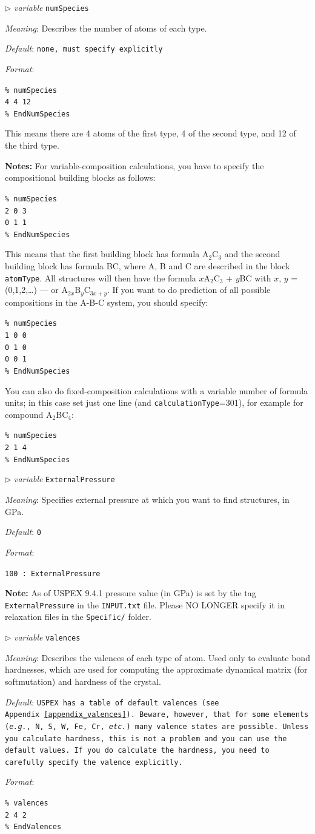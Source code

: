 \documentclass[12pt]{article}
\newcommand{\keyword}[1]{\texttt{#1}}
\newcommand{\file}[1]{\texttt{#1}}
\newcommand{\textshift}[1]{{\addtolength{\leftskip}{10mm}\texttt{{#1}}\par}}
\newcommand{\paramacro}[6]{
\vspace{0.5cm}
$\triangleright$ \emph{variable} {\color{blue} \texttt{#1}}

\emph{Meaning}: {#2}

{#3}

\emph{Default}: \texttt{#4}

\emph{Format}:

{\addtolength{\leftskip}{10mm} 
\texttt{#5}
\par}


{\small #6}

}
\begin{document}
\paramacro{numSpecies}{Describes the number of atoms of each type.}{}{\rm none,
must specify explicitly}{\% numSpecies \\
4 4 12 \\
\% EndNumSpecies}{
This means there are 4 atoms of the first type, 4 of the second type, and 12 of
the third type.

\textbf{Notes:} For variable-composition calculations, you have to specify the
compositional building blocks as follows:

\textshift{\% numSpecies \\
2 0 3 \\
0 1 1 \\
\% EndNumSpecies
}{}

This means that the first building block has formula A$_2$C$_3$ and the second
building block has formula BC, where A, B and C are described in the block
\keyword{atomType}. All structures will then have the formula $x$A$_2$C$_3$ +
$y$BC with $x$, $y$ = (0,1,2,\ldots) --- or A$_{2x}$B$_y$C$_{3x+y}$. If you want
to do prediction of all possible compositions in the A-B-C system, you should
specify:

\textshift{\% numSpecies \\
1 0 0 \\
0 1 0 \\
0 0 1 \\
\% EndNumSpecies
}

You can also do fixed-composition calculations with a variable number of formula
units; in this case set just one line (and \keyword{calculationType}=301), for
example for compound A$_2$BC$_4$:

\textshift{\% numSpecies \\
2 1 4 \\
\% EndNumSpecies
}
}


\paramacro{ExternalPressure}{Specifies external pressure at which you want to
find structures, in GPa.}{} {0}{100 : ExternalPressure}{\textbf{Note:} As of
USPEX 9.4.1 pressure value (in GPa) is set by the tag \keyword{ExternalPressure}
in the \file{INPUT.txt} file. Please NO LONGER specify it in relaxation files in
the \file{Specific/} folder.}


\paramacro{valences}{Describes the valences of each type of atom. Used only to
evaluate bond hardnesses, which are used for computing the approximate dynamical
matrix (for softmutation) and hardness of the crystal.}{}{\rm USPEX has a table
of default valences (see Appendix~\ref{appendix_valences}). Beware, however,
that for some elements (\emph{e.g.}, N, S, W, Fe, Cr, \emph{etc.}) many valence
states are possible. Unless you calculate hardness, this is not a problem and
you can use the default values. If you do calculate the hardness, you need to
carefully specify the valence explicitly.
}{\% valences \\
2 4 2 \\
\% EndValences }{}
\end{document}
